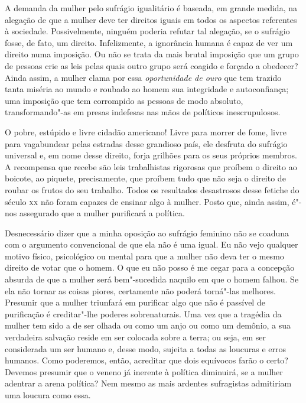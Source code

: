 A demanda da mulher pelo sufrágio igualitário é baseada, em grande
medida, na alegação de que a mulher deve ter direitos iguais em todos os aspectos referentes à sociedade. Possivelmente, ninguém poderia refutar
tal alegação, se o sufrágio fosse, de fato, um direito. Infelizmente, a
ignorância humana é capaz de ver um direito numa imposição. Ou não se
trata da mais brutal imposição que um grupo de pessoas crie as leis
pelas quais outro grupo será coagido e forçado a obedecer? Ainda assim,
a mulher clama por essa \textit{oportunidade de ouro} que tem trazido tanta
miséria ao mundo e roubado ao homem sua integridade e autoconfiança; uma
imposição que tem corrompido as pessoas de modo absoluto,
transformando"-as em presas indefesas nas mãos de políticos
inescrupulosos.

O pobre, estúpido e livre cidadão americano! Livre para morrer de fome,
livre para vagabundear pelas estradas desse grandioso país, ele desfruta
do sufrágio universal e, em nome desse direito, forja grilhões para os seus
próprios membros. A recompensa que recebe são leis trabalhistas
rigorosas que proíbem o direito ao boicote, ao piquete, precisamente,
que proíbem tudo que não seja o direito de roubar os frutos do seu
trabalho. Todos os resultados desastrosos desse fetiche do século \textsc{xx} não
foram capazes de ensinar algo à mulher. Posto que, ainda assim, é"-nos assegurado que a mulher purificará a política.

Desnecessário dizer que a minha oposição ao sufrágio feminino não se
coaduna com o argumento convencional de que ela não é uma igual. Eu não
vejo qualquer motivo físico, psicológico ou mental para que a mulher não
deva ter o mesmo direito de votar que o homem. O que eu não posso é me
cegar para a concepção absurda de que a mulher será bem"-sucedida naquilo
em que o homem falhou. Se ela não tornar as coisas piores, certamente
não poderá torná"-las melhores. Presumir que a mulher triunfará em
purificar algo que não é passível de purificação é creditar"-lhe poderes\label{purificar}
sobrenaturais. Uma vez que a tragédia da mulher tem sido a de ser olhada
ou como um anjo ou como um demônio, a sua verdadeira salvação reside em ser
colocada sobre a terra; ou seja, em ser considerada um ser humano e,
desse modo, sujeita a todas as loucuras e erros humanos. Como poderemos,
então, acreditar que dois equívocos farão o certo? Devemos presumir que
o veneno já inerente à política diminuirá, se a mulher adentrar a arena
política? Nem mesmo as mais ardentes sufragistas admitiriam uma loucura
como essa.

